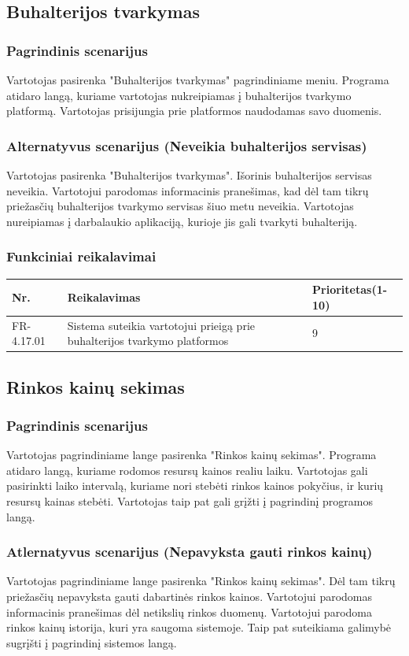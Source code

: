 \documentclass[oneside]{VUMIFPSkursinis}
\begin{document}
\subsection{Buhalterijos tvarkymas}
	\subsubsection{Pagrindinis scenarijus}
	Vartotojas pasirenka "Buhalterijos tvarkymas" pagrindiniame meniu. Programa atidaro langą, kuriame vartotojas nukreipiamas į buhalterijos tvarkymo platformą. Vartotojas prisijungia prie platformos naudodamas savo duomenis.
	\subsubsection{Alternatyvus scenarijus (Neveikia buhalterijos servisas)}
	Vartotojas pasirenka "Buhalterijos tvarkymas". Išorinis buhalterijos servisas neveikia. Vartotojui parodomas informacinis pranešimas, kad dėl tam tikrų priežasčių buhalterijos tvarkymo servisas šiuo metu neveikia. Vartotojas nureipiamas į darbalaukio aplikaciją, kurioje jis gali tvarkyti buhalteriją.
	\subsubsection{Funkciniai reikalavimai}
	\begin{table}[htbp]
	\begin{tabularx}{1\textwidth}{ |P{2.5cm}|X|P{3cm }| }  \hline
		Nr. & Reikalavimas & Prioritetas(1-10) \\ \hline
		FR-4.17.01 & Sistema suteikia vartotojui prieigą prie buhalterijos tvarkymo platformos & 9 \\ \hline
	\end{tabularx}
\end{table}
\subsection{Rinkos kainų sekimas}
	\subsubsection{Pagrindinis scenarijus}
	Vartotojas pagrindiniame lange pasirenka "Rinkos kainų sekimas". Programa atidaro langą, kuriame rodomos resursų kainos realiu laiku. Vartotojas gali pasirinkti laiko intervalą, kuriame nori stebėti rinkos kainos pokyčius, ir kurių resursų kainas stebėti. Vartotojas taip pat gali grįžti į pagrindinį programos langą.
\pagebreak
	\subsubsection{Atlernatyvus scenarijus (Nepavyksta gauti rinkos kainų)}
	Vartotojas pagrindiniame lange pasirenka "Rinkos kainų sekimas". Dėl tam tikrų priežasčių nepavyksta gauti dabartinės rinkos kainos. Vartotojui parodomas informacinis pranešimas dėl netikslių rinkos duomenų. Vartotojui parodoma rinkos kainų istorija, kuri yra saugoma sistemoje. Taip pat suteikiama galimybė sugrįšti į pagrindinį sistemos langą.
\end{document}
